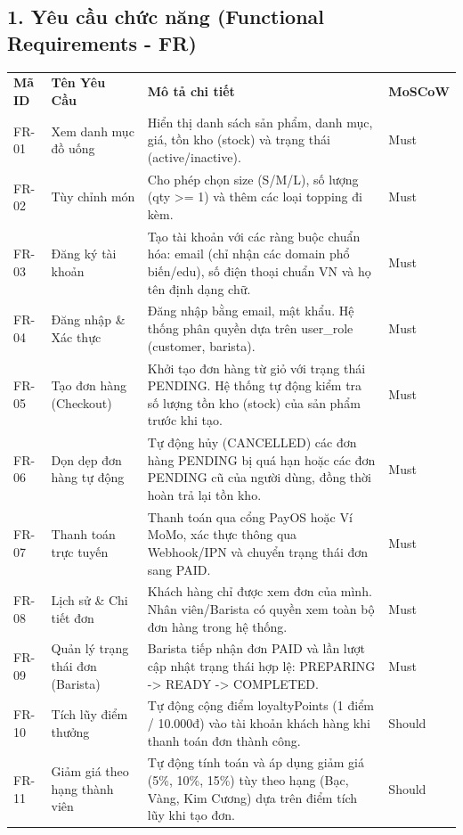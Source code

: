 \documentclass[
]{article}
\author{}
\date{}
\begin{document}
\subsection{1. Yêu cầu chức năng (Functional Requirements - FR)}\label{yuxeau-cux1ea7u-chux1ee9c-nux103ng-functional-requirements---fr}

\begin{longtable}[]{@{}
  >{\raggedright\arraybackslash}p{}
  >{\raggedright\arraybackslash}p{}
  >{\raggedright\arraybackslash}p{}
  >{\raggedright\arraybackslash}p{}@{}}
\toprule\noalign{}
\endhead
\bottomrule\noalign{}
\endlastfoot
\textbf{Mã ID} & \textbf{Tên Yêu Cầu} & \textbf{Mô tả chi tiết} & \textbf{MoSCoW} \\
FR-01 & Xem danh mục đồ uống & Hiển thị danh sách sản phẩm, danh mục, giá, tồn kho (stock) và trạng thái (active/inactive). & Must \\
FR-02 & Tùy chỉnh món & Cho phép chọn size (S/M/L), số lượng (qty \textgreater= 1) và thêm các loại topping đi kèm. & Must \\
FR-03 & Đăng ký tài khoản & Tạo tài khoản với các ràng buộc chuẩn hóa: email (chỉ nhận các domain phổ biến/edu), số điện thoại chuẩn VN và họ tên định dạng chữ. & Must \\
FR-04 & Đăng nhập \& Xác thực & Đăng nhập bằng email, mật khẩu. Hệ thống phân quyền dựa trên user\_role (customer, barista). & Must \\
FR-05 & Tạo đơn hàng (Checkout) & Khởi tạo đơn hàng từ giỏ với trạng thái PENDING. Hệ thống tự động kiểm tra số lượng tồn kho (stock) của sản phẩm trước khi tạo. & Must \\
FR-06 & Dọn dẹp đơn hàng tự động & Tự động hủy (CANCELLED) các đơn hàng PENDING bị quá hạn hoặc các đơn PENDING cũ của người dùng, đồng thời hoàn trả lại tồn kho. & Must \\
FR-07 & Thanh toán trực tuyến & Thanh toán qua cổng PayOS hoặc Ví MoMo, xác thực thông qua Webhook/IPN và chuyển trạng thái đơn sang PAID. & Must \\
FR-08 & Lịch sử \& Chi tiết đơn & Khách hàng chỉ được xem đơn của mình. Nhân viên/Barista có quyền xem toàn bộ đơn hàng trong hệ thống. & Must \\
FR-09 & Quản lý trạng thái đơn (Barista) & Barista tiếp nhận đơn PAID và lần lượt cập nhật trạng thái hợp lệ: PREPARING -\textgreater{} READY -\textgreater{} COMPLETED. & Must \\
FR-10 & Tích lũy điểm thưởng & Tự động cộng điểm loyaltyPoints (1 điểm / 10.000đ) vào tài khoản khách hàng khi thanh toán đơn thành công. & Should \\
FR-11 & Giảm giá theo hạng thành viên & Tự động tính toán và áp dụng giảm giá (5\%, 10\%, 15\%) tùy theo hạng (Bạc, Vàng, Kim Cương) dựa trên điểm tích lũy khi tạo đơn. & Should \\
\end{longtable}
\end{document}
